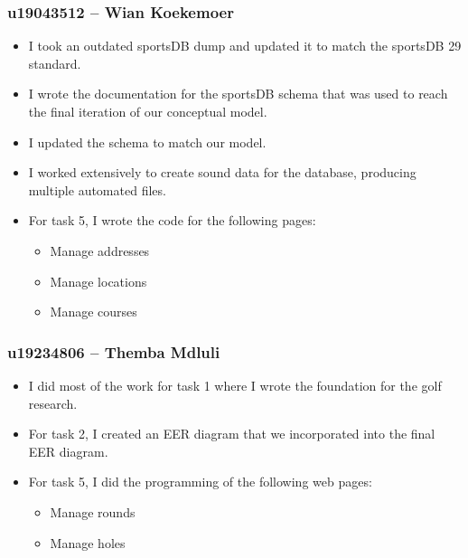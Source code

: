 \documentclass[titlepage]{article}
\begin{document}
\subsubsection*{u19043512 – Wian Koekemoer}
\vspace{1em}
\begin{itemize}
  \item I took an outdated sportsDB dump and updated it to match the sportsDB 29 standard.
  \item I wrote the documentation for the sportsDB schema that was used to reach the final iteration of our conceptual model. 
  \item I updated the schema to match our model. 
  \item I worked extensively to create sound data for the database, producing multiple automated files.
  \item For task 5, I wrote the code for the following pages:
  \begin{itemize}
    \item Manage addresses 
    \item Manage locations 
    \item Manage courses
  \end{itemize}
\end{itemize}
\vspace{1em}
\subsubsection*{u19234806 – Themba Mdluli}
\vspace{1em}
\begin{itemize}
  \item I did most of the work for task 1 where I wrote the foundation for the golf research.
  \item For task 2, I created an EER diagram that we incorporated into the final EER diagram.
  \item For task 5, I did the programming of the following web pages:
  \begin{itemize}
    \item Manage rounds
    \item Manage holes
  \end{itemize}
\end{itemize}
\vspace{1em}
\end{document}
